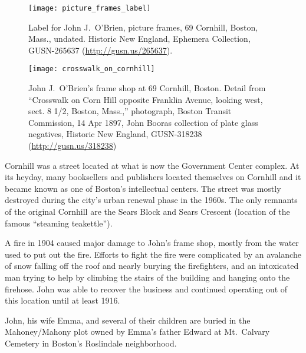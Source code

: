 \begin{figure}
\centering
\texttt{[image: picture\_frames\_label]}
\caption{Label for John J.\ O'Brien, picture frames, 69 Cornhill, Boston, Mass., undated. Historic New England, Ephemera Collection, GUSN-265637 (\url{http://gusn.us/265637}).}
\end{figure}

\begin{figure}
	\centering
	\texttt{[image: crosswalk\_on\_cornhill]}
	\caption{John J.\ O'Brien's frame shop at 69 Cornhill, Boston. Detail from ``Crosswalk on Corn Hill opposite Franklin Avenue, looking west, sect. 8 1/2, Boston, Mass.,'' photograph, Boston Transit Commission, 14 Apr 1897, John Booras collection of plate glass negatives, Historic New England, GUSN-318238 (\url{http://gusn.us/318238}) }
\end{figure}

Cornhill was a street located at what is now the Government Center complex. At its heyday, many booksellers and publishers located themselves on Cornhill and it became known as one of Boston's intellectual centers.\cite{Cornhill} The street was mostly destroyed during the city's urban renewal phase in the 1960s. The only remnants of the original Cornhill are the Sears Block and Sears Crescent (location of the famous ``steaming teakettle'').\cite{Cornhill}

A fire in 1904 caused major damage to John's frame shop, mostly from the water used to put out the fire. Efforts to fight the fire were complicated by an avalanche of snow falling off the roof and nearly burying the firefighters, and an intoxicated man trying to help by climbing the stairs of the building and hanging onto the firehose.\cite{FrameShopFire} John was able to recover the business and continued operating out of this location until at least 1916.\cite{John3OBrien1916}

John, his wife Emma, and several of their children are buried in the Mahoney/Mahony plot owned by Emma's father Edward at Mt.\ Calvary Cemetery in Boston's Roslindale neighborhood.\cite{John3OBrienBurial}

